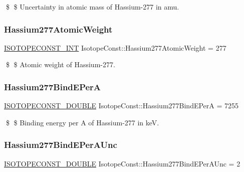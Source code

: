 \$ \$ Uncertainty in atomic mass of Hassium-\/277 in amu. \mbox{\label{group___isotope_const-_hassium-_hs277_ga28d988e1b59aa8fee42ca809d222a55a}} 
\subsubsection{\texorpdfstring{Hassium277\+Atomic\+Weight}{Hassium277AtomicWeight}}
{\footnotesize\ttfamily \mbox{\hyperlink{group___isotope_const-_macros_ga5f18360b3e99483a35c32d789e62621c}{I\+S\+O\+T\+O\+P\+E\+C\+O\+N\+S\+T\+\_\+\+I\+NT}} Isotope\+Const\+::\+Hassium277\+Atomic\+Weight = 277}

\$ \$ Atomic weight of Hassium-\/277. \mbox{\label{group___isotope_const-_hassium-_hs277_ga33efc33b539d50b8556cb4790451ca30}} 
\subsubsection{\texorpdfstring{Hassium277\+Bind\+E\+PerA}{Hassium277BindEPerA}}
{\footnotesize\ttfamily \mbox{\hyperlink{group___isotope_const-_macros_ga8f45a7272ce02c0b4c65c44636ed719a}{I\+S\+O\+T\+O\+P\+E\+C\+O\+N\+S\+T\+\_\+\+D\+O\+U\+B\+LE}} Isotope\+Const\+::\+Hassium277\+Bind\+E\+PerA = 7255}

\$ \$ Binding energy per A of Hassium-\/277 in keV. \mbox{\label{group___isotope_const-_hassium-_hs277_ga9e47c9203b113746bdd3211fa9dc4e90}} 
\subsubsection{\texorpdfstring{Hassium277\+Bind\+E\+Per\+A\+Unc}{Hassium277BindEPerAUnc}}
{\footnotesize\ttfamily \mbox{\hyperlink{group___isotope_const-_macros_ga8f45a7272ce02c0b4c65c44636ed719a}{I\+S\+O\+T\+O\+P\+E\+C\+O\+N\+S\+T\+\_\+\+D\+O\+U\+B\+LE}} Isotope\+Const\+::\+Hassium277\+Bind\+E\+Per\+A\+Unc = 2}

